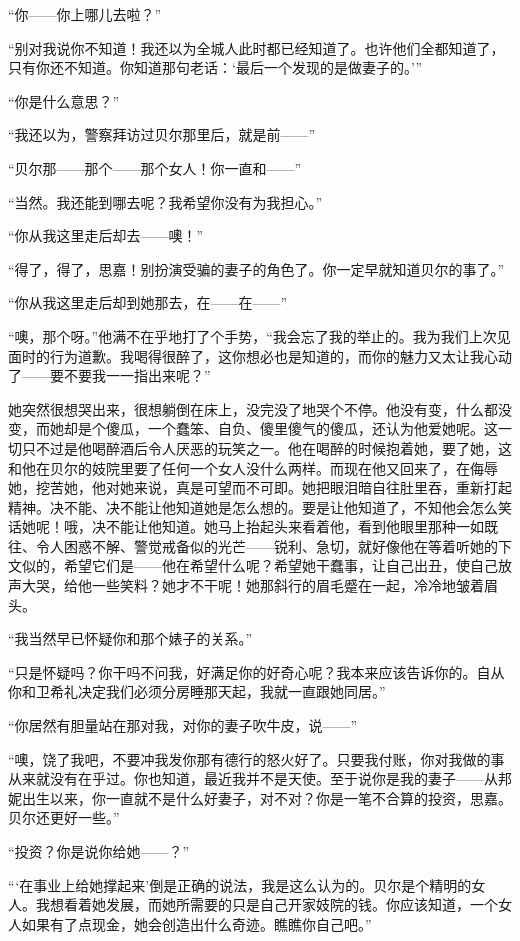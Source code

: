 \par “你——你上哪儿去啦？”
\par “别对我说你不知道！我还以为全城人此时都已经知道了。也许他们全都知道了，只有你还不知道。你知道那句老话：‘最后一个发现的是做妻子的。'”
\par “你是什么意思？”
\par “我还以为，警察拜访过贝尔那里后，就是前——”
\par “贝尔那——那个——那个女人！你一直和——”
\par “当然。我还能到哪去呢？我希望你没有为我担心。”
\par “你从我这里走后却去——噢！”
\par “得了，得了，思嘉！别扮演受骗的妻子的角色了。你一定早就知道贝尔的事了。”
\par “你从我这里走后却到她那去，在——在——”
\par “噢，那个呀。”他满不在乎地打了个手势，“我会忘了我的举止的。我为我们上次见面时的行为道歉。我喝得很醉了，这你想必也是知道的，而你的魅力又太让我心动了——要不要我一一指出来呢？”
\par 她突然很想哭出来，很想躺倒在床上，没完没了地哭个不停。他没有变，什么都没变，而她却是个傻瓜，一个蠢笨、自负、傻里傻气的傻瓜，还认为他爱她呢。这一切只不过是他喝醉酒后令人厌恶的玩笑之一。他在喝醉的时候抱着她，要了她，这和他在贝尔的妓院里要了任何一个女人没什么两样。而现在他又回来了，在侮辱她，挖苦她，他对她来说，真是可望而不可即。她把眼泪暗自往肚里吞，重新打起精神。决不能、决不能让他知道她是怎么想的。要是让他知道了，不知他会怎么笑话她呢！哦，决不能让他知道。她马上抬起头来看着他，看到他眼里那种一如既往、令人困惑不解、警觉戒备似的光芒——锐利、急切，就好像他在等着听她的下文似的，希望它们是——他在希望什么呢？希望她干蠢事，让自己出丑，使自己放声大哭，给他一些笑料？她才不干呢！她那斜行的眉毛蹙在一起，冷冷地皱着眉头。
\par “我当然早已怀疑你和那个婊子的关系。”
\par “只是怀疑吗？你干吗不问我，好满足你的好奇心呢？我本来应该告诉你的。自从你和卫希礼决定我们必须分房睡那天起，我就一直跟她同居。”
\par “你居然有胆量站在那对我，对你的妻子吹牛皮，说——”
\par “噢，饶了我吧，不要冲我发你那有德行的怒火好了。只要我付账，你对我做的事从来就没有在乎过。你也知道，最近我并不是天使。至于说你是我的妻子——从邦妮出生以来，你一直就不是什么好妻子，对不对？你是一笔不合算的投资，思嘉。贝尔还更好一些。”
\par “投资？你是说你给她——？”
\par “‘在事业上给她撑起来’倒是正确的说法，我是这么认为的。贝尔是个精明的女人。我想看着她发展，而她所需要的只是自己开家妓院的钱。你应该知道，一个女人如果有了点现金，她会创造出什么奇迹。瞧瞧你自己吧。”
